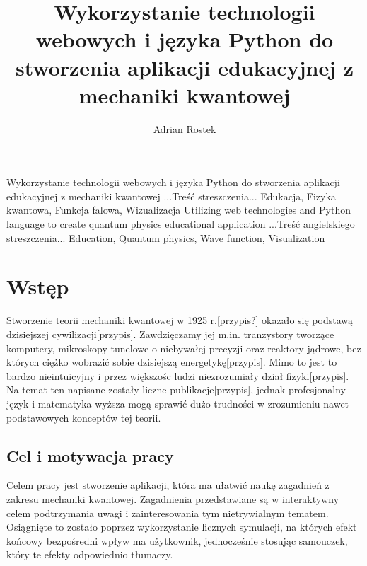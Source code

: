 \documentclass{SGGW-thesis}
\title{Wykorzystanie technologii webowych i języka Python do stworzenia aplikacji edukacyjnej z mechaniki kwantowej}
\author{Adrian Rostek}
\begin{document}
\maketitle
\statementpage
\abstractpage
{Wykorzystanie technologii webowych i języka Python do stworzenia aplikacji edukacyjnej z mechaniki kwantowej}
{...Treść streszczenia...}
{Edukacja, Fizyka kwantowa, Funkcja falowa, Wizualizacja}
{Utilizing web technologies and Python language to create quantum physics educational application}
{...Treść angielskiego streszczenia...}
{Education, Quantum physics, Wave function, Visualization}


{
  \doublespacing
  \tableofcontents
}

\startchapterfromoddpage %

\chapter{Wstęp}
Stworzenie teorii mechaniki kwantowej w 1925 r.[przypis?] okazało się podstawą dzisiejszej cywilizacji[przypis]. Zawdzięczamy jej m.in. tranzystory tworzące komputery, mikroskopy tunelowe o niebywałej precyzji oraz reaktory jądrowe, bez których ciężko wobrazić sobie dzisiejszą energetykę[przypis]. Mimo to jest to bardzo nieintuicyjny i przez większośc ludzi niezrozumiały dział fizyki[przypis]. Na temat ten napisane zostały liczne publikacje[przypis], jednak profesjonalny język i matematyka wyższa mogą sprawić dużo trudności w zrozumieniu nawet podstawowych konceptów tej teorii.


	\section{Cel i motywacja pracy}
	Celem pracy jest stworzenie aplikacji, która ma ułatwić naukę zagadnień z zakresu mechaniki kwantowej. Zagadnienia przedstawiane są w interaktywny celem podtrzymania uwagi i zainteresowania tym nietrywialnym tematem. Osiągnięte to zostało poprzez wykorzystanie licznych symulacji, na których efekt końcowy bezpośredni wpływ ma użytkownik, jednocześnie stosując samouczek, który te efekty odpowiednio tłumaczy.
	
\end{document}
